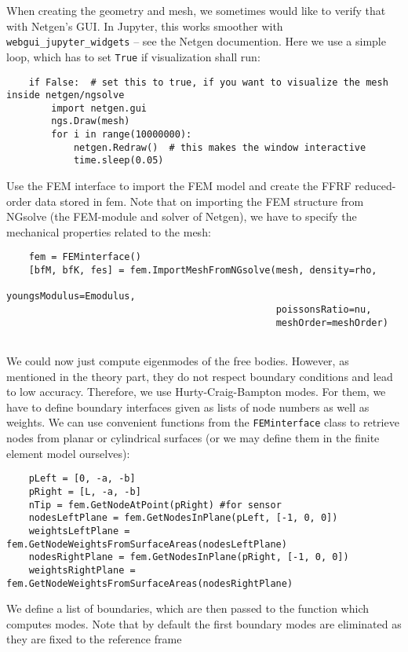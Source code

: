 %
When creating the geometry and mesh, we sometimes would like to verify that with Netgen's GUI. 
In Jupyter, this works smoother with \texttt{webgui\_jupyter\_widgets} -- see the Netgen documention. Here we use a simple loop, which has to set \texttt{True} if visualization shall run:
\pythonstyle\begin{lstlisting}
    if False:  # set this to true, if you want to visualize the mesh inside netgen/ngsolve
        import netgen.gui
        ngs.Draw(mesh)
        for i in range(10000000):
            netgen.Redraw()  # this makes the window interactive
            time.sleep(0.05)
\end{lstlisting}
%
Use the FEM interface to import the FEM model and create the FFRF reduced-order data stored in fem.
Note that on importing the FEM structure from NGsolve (the FEM-module and solver of Netgen), we 
have to specify the mechanical properties related to the mesh:
\pythonstyle\begin{lstlisting}
    fem = FEMinterface()
    [bfM, bfK, fes] = fem.ImportMeshFromNGsolve(mesh, density=rho, 
                                                youngsModulus=Emodulus, 
                                                poissonsRatio=nu,
                                                meshOrder=meshOrder)
                                                
\end{lstlisting}
%
We could now just compute eigenmodes of the free bodies. However, as mentioned in the theory part, they do not respect boundary conditions and lead to low accuracy. Therefore, we use Hurty-Craig-Bampton modes.
For them, we have to define boundary interfaces given as lists of node numbers as well as weights.
We can use convenient functions from the \texttt{FEMinterface} class to retrieve nodes from planar or cylindrical surfaces (or we may define them in the finite element model ourselves):
\pythonstyle\begin{lstlisting}
    pLeft = [0, -a, -b]
    pRight = [L, -a, -b]
    nTip = fem.GetNodeAtPoint(pRight) #for sensor
    nodesLeftPlane = fem.GetNodesInPlane(pLeft, [-1, 0, 0])
    weightsLeftPlane = fem.GetNodeWeightsFromSurfaceAreas(nodesLeftPlane)
    nodesRightPlane = fem.GetNodesInPlane(pRight, [-1, 0, 0])
    weightsRightPlane = fem.GetNodeWeightsFromSurfaceAreas(nodesRightPlane)
\end{lstlisting}
%
We define a list of boundaries, which are then passed to the function which computes modes.
Note that by default the first boundary modes are eliminated as they are fixed to the reference frame
